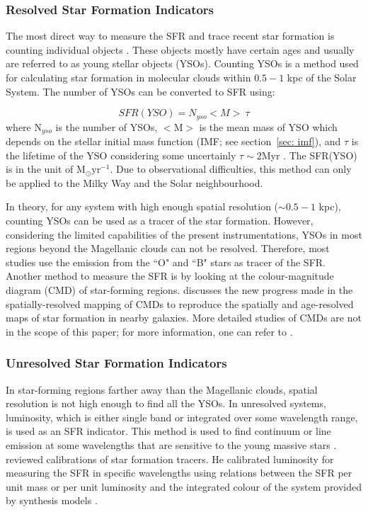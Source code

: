 \subsubsection{Resolved Star Formation Indicators}
The most direct way to measure the SFR and trace recent star formation is counting individual objects \citep{Kennicutt12}. These objects mostly have certain ages and usually are referred to as young stellar objects (YSOs). Counting YSOs is a method used for calculating star formation in molecular clouds within $0.5- 1$ kpc of the Solar System. The number of YSOs can be converted to SFR using: 

\begin{equation}
SFR(YSO) = N_{yso} <M> \ \tau 
\end{equation}
where N$_{yso}$ is the number of YSOs, $<$M$>$ is the mean mass of YSO which depends on the stellar initial mass function (IMF; see section~\ref{sec: imf}), and $\tau$ is the lifetime of the YSO considering some uncertainly $\tau \sim 2$Myr \citep{Evans09}. The SFR(YSO) is in the unit of M$_{\odot}$yr$^{-1}$. Due to observational difficulties, this method can only be applied to the Milky Way and the Solar neighbourhood. 

In theory, for any system with high enough spatial resolution ($\sim 0.5- 1$ kpc), counting YSOs can be used as a tracer of the star formation. However, considering the limited capabilities of the present instrumentations, YSOs in most regions beyond the Magellanic clouds can not be resolved. Therefore, most studies use the emission from the ``O" and ``B" stars as tracer of the SFR. Another method to measure the SFR is by looking at the colour-magnitude diagram (CMD) of star-forming regions. \cite{Kennicutt12} discusses the new progress made in the spatially-resolved mapping of CMDs to reproduce the spatially and age-resolved maps of star formation in nearby galaxies. More detailed studies of CMDs are not in the scope of this paper; for more information, one can refer to \citep{Kennicutt12}. 

\subsubsection{Unresolved Star Formation Indicators}
 In star-forming regions farther away than the Magellanic clouds, spatial resolution is not high enough to find all the YSOs. In unresolved systems, luminosity, which is either single band or integrated over some wavelength range, is used as an SFR indicator. This method is used to find continuum or line emission at some wavelengths that are sensitive to the young massive stars \citep[e.g.,][]{Kennicutt98b, Calzetti13}. \cite{Kennicutt98b} reviewed calibrations of star formation tracers. He calibrated luminosity for measuring the SFR in specific wavelengths using relations between the SFR per unit mass or per unit luminosity and the integrated colour of the system provided by synthesis models \citep[e.g.,][]{Bruzual93}. 

